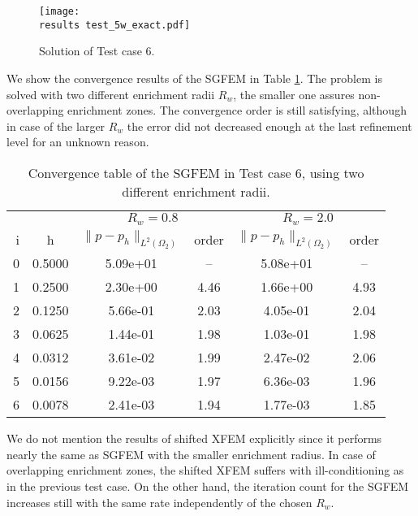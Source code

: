 %
\begin{figure}[!htb]
  \centering    
    \texttt{[image: \\results test\_5w\_exact.pdf]}
  \caption{Solution of Test case 6.}
  \label{fig:test_5w_exact}
\end{figure}
%

We show the convergence results of the SGFEM in Table \ref{tab:convergence_test6}. The problem is solved with
two different enrichment radii $R_w$, the smaller one assures non-overlapping enrichment zones.
The convergence order is still satisfying, although in case of the larger $R_w$ the error did not decreased enough
at the last refinement level for an unknown reason.
\begin{table}[!htb]
\begin{center}
\bgroup
\def\arraystretch{1.2}
\setlength\tabcolsep{5pt}
\begin{tabular}{rc|cc|cc}
\toprule
\multicolumn{2}{c|}{} & \multicolumn{2}{c|}{$R_w=0.8$} & \multicolumn{2}{c}{$R_w=2.0$}\\ [3pt] %
i & h & $\|p-p_h\|_{L^2(\Omega_2)}$ & order & $\|p-p_h\|_{L^2(\Omega_2)}$ & order \\ [3pt] \midrule
0 & 0.5000 & 5.09e+01 & --   & 5.08e+01 & --   \\ %
1 & 0.2500 & 2.30e+00 & 4.46 & 1.66e+00 & 4.93 \\ %
2 & 0.1250 & 5.66e-01 & 2.03 & 4.05e-01 & 2.04 \\ %
3 & 0.0625 & 1.44e-01 & 1.98 & 1.03e-01 & 1.98 \\ %
4 & 0.0312 & 3.61e-02 & 1.99 & 2.47e-02 & 2.06 \\ %
5 & 0.0156 & 9.22e-03 & 1.97 & 6.36e-03 & 1.96 \\ %
6 & 0.0078 & 2.41e-03 & 1.94 & 1.77e-03 & 1.85 \\ %
\bottomrule
\end{tabular}
\caption[Convergence table in Test case 6.]
{Convergence table of the SGFEM in Test case 6, using two different enrichment radii.}
\label{tab:convergence_test6}
\egroup
\end{center}
\end{table}

We do not mention the results of shifted XFEM explicitly since it performs nearly the same as SGFEM with the smaller enrichment radius.
In case of overlapping enrichment zones, the shifted XFEM suffers with ill-conditioning as in the previous test case.
On the other hand, the iteration count for the SGFEM increases still with the same rate independently of the chosen $R_w$.



